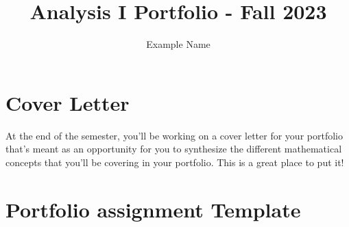 \documentclass[11 pt]{article}
\title{Analysis I Portfolio - Fall 2023} %
\author{Example Name} %
\date{} %
\begin{document}
\maketitle

\section{Cover Letter}

At the end of the semester, you'll be working on a cover letter for your portfolio that's meant as an opportunity for you to synthesize the different mathematical concepts that you'll be covering in your portfolio. This is a great place to put it!

\pagebreak
\section{Portfolio assignment Template}
\end{document}
